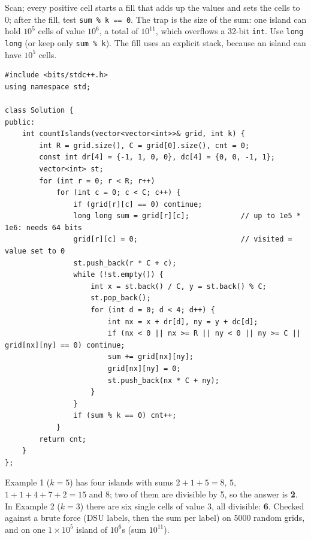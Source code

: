 \begin{solutionbox}
Scan; every positive cell starts a fill that adds up the values and sets the cells to $0$; after the fill, test \texttt{sum \% k == 0}. The trap is the size of the sum: one island can hold $10^5$ cells of value $10^6$, a total of $10^{11}$, which overflows a 32-bit \texttt{int}. Use \texttt{long long} (or keep only \texttt{sum \% k}). The fill uses an explicit stack, because an island can have $10^5$ cells.
\begin{lstlisting}[style=cpp]
#include <bits/stdc++.h>
using namespace std;

class Solution {
public:
    int countIslands(vector<vector<int>>& grid, int k) {
        int R = grid.size(), C = grid[0].size(), cnt = 0;
        const int dr[4] = {-1, 1, 0, 0}, dc[4] = {0, 0, -1, 1};
        vector<int> st;
        for (int r = 0; r < R; r++)
            for (int c = 0; c < C; c++) {
                if (grid[r][c] == 0) continue;
                long long sum = grid[r][c];            // up to 1e5 * 1e6: needs 64 bits
                grid[r][c] = 0;                        // visited = value set to 0
                st.push_back(r * C + c);
                while (!st.empty()) {
                    int x = st.back() / C, y = st.back() % C;
                    st.pop_back();
                    for (int d = 0; d < 4; d++) {
                        int nx = x + dr[d], ny = y + dc[d];
                        if (nx < 0 || nx >= R || ny < 0 || ny >= C || grid[nx][ny] == 0) continue;
                        sum += grid[nx][ny];
                        grid[nx][ny] = 0;
                        st.push_back(nx * C + ny);
                    }
                }
                if (sum % k == 0) cnt++;
            }
        return cnt;
    }
};
\end{lstlisting}
Example 1 ($k = 5$) has four islands with sums $2+1+5 = 8$, $5$, $1+1+4+7+2 = 15$ and $8$; two of them are divisible by 5, so the answer is \textbf{2}. In Example 2 ($k = 3$) there are six single cells of value 3, all divisible: \textbf{6}. Checked against a brute force (DSU labels, then the sum per label) on 5000 random grids, and on one $1\times10^5$ island of $10^6$s (sum $10^{11}$).
\end{solutionbox}
